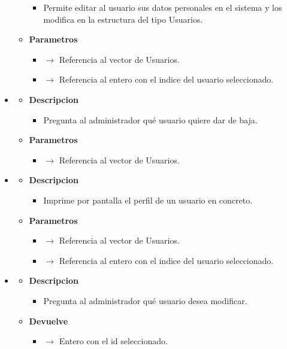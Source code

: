 \begin{itemize}
\begin{itemize}
\begin{itemize}
			\item Permite editar al usuario sus datos personales en el sistema y los modifica en la estructura del tipo Usuarios.
		\end{itemize}
        \item \textbf{Parametros}
		\begin{itemize}
			\item {} $\rightarrow$ Referencia al vector de Usuarios.
            \item {} $\rightarrow$ Referencia al entero con el indice del usuario seleccionado.
		\end{itemize}
	\end{itemize}
    \newpage
    \item{}
	\begin{itemize}
		\item \textbf{Descripcion}
        \begin{itemize}
			\item Pregunta al administrador qué usuario quiere dar de baja.
		\end{itemize}
        \item \textbf{Parametros}
		\begin{itemize}
			\item {} $\rightarrow$ Referencia al vector de Usuarios.
		\end{itemize}
	\end{itemize}
    \item{}
	\begin{itemize}
		\item \textbf{Descripcion}
        \begin{itemize}
			\item Imprime por pantalla el perfil de un usuario en concreto.
		\end{itemize}
        \item \textbf{Parametros}
		\begin{itemize}
			\item {} $\rightarrow$ Referencia al vector de Usuarios.
            \item {} $\rightarrow$ Referencia al entero con el indice del usuario seleccionado.
		\end{itemize}
	\end{itemize}
    \item{}
	\begin{itemize}
		\item \textbf{Descripcion}
        \begin{itemize}
			\item Pregunta al administrador qué usuario desea modificar.
		\end{itemize}
        \item \textbf{Devuelve}
		\begin{itemize}
			\item {} $\rightarrow$ Entero con el id seleccionado.
		\end{itemize}
	\end{itemize}
\end{itemize}
\newpage
